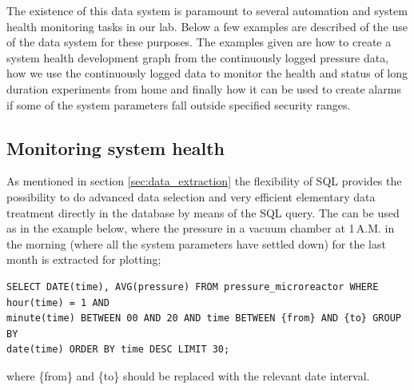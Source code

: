 The existence of this data system is paramount to several automation and system
health monitoring tasks in our lab. Below a few examples are described of the
use of the data system for these purposes. The examples given are how to create
a system health development graph from the continuously logged pressure data,
how we use the continuously logged data to monitor the health and status of
long duration experiments from home and finally how it can be used to create
alarms if some of the system parameters fall outside specified security ranges.

\subsection{Monitoring system health}
\label{sec:morning_pressure}
As mentioned in section \ref{sec:data_extraction} the flexibility of SQL
provides the possibility to do advanced data selection and very efficient
elementary data treatment directly in the database by means of the SQL query.
The can be used as in the example below, where the pressure in a vacuum
chamber at 1\,A.M. in the morning (where all the system parameters have settled
down) for the last month is extracted for plotting; 

\begin{verbatim} 
SELECT DATE(time), AVG(pressure) FROM pressure_microreactor WHERE hour(time) = 1 AND
minute(time) BETWEEN 00 AND 20 AND time BETWEEN {from} AND {to} GROUP BY
date(time) ORDER BY time DESC LIMIT 30; \end{verbatim} 

where \{from\} and \{to\} should be replaced with the relevant date interval.

